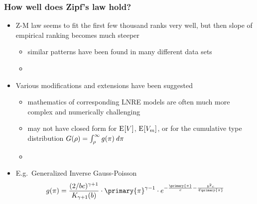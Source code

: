 \documentclass[handout,notes=show,t]{beamer} %
\begin{document}
\begin{frame}
  \frametitle{How well does Zipf's law hold?}

  \begin{itemize}
  \item Z-M law seems to fit the first few thousand ranks very well, but then slope of empirical ranking becomes much steeper
    \begin{itemize}
    \item similar patterns have been found in many different data sets
    \item[]
    \end{itemize}
  \item<2-> Various modifications and extensions have been suggested \citep{Sichel:71,Kornai:99,Montemurro:01}
    \begin{itemize}
    \item mathematics of corresponding LNRE models are often much more complex and numerically challenging
    \item may not have closed form for $\mathrm{E}_{}[V]$, $\mathrm{E}_{}[V_m]$, or for the cumulative type distribution $G(\rho) = \int_{\rho}^{\infty} g(\pi) \,\mathit{d{\pi}}$
    \item[]
    \end{itemize}
  \item<3-> E.g.\ Generalized Inverse Gauss-Poisson \citep[GIGP;][]{Sichel:71}
    \[
      g(\pi) =
      \frac{(2 / bc)^{\gamma + 1}}{K_{\gamma+1}(b)} \cdot
      \primary{\pi}^{\gamma-1} \cdot
      e^{-\frac{\primary{\pi}}{c} - \frac{b^2 c}{4 \primary{\pi}}}
    \]
  \end{itemize}
\end{frame}
\end{document}
